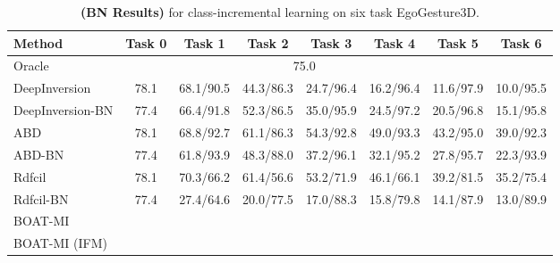 \documentclass[11pt]{article}
\begin{document}
\begin{table*}[h]
\centering
\caption{ \textbf{(BN Results)} for class-incremental learning on six task EgoGesture3D.}
\begin{tabular}{lccccccc}
\toprule
            Method &    Task 0 &    Task 1 &    Task 2 &    Task 3 &    Task 4 &    Task 5 &    Task 6 \\
\midrule
            Oracle &      \multicolumn{6}{c}{75.0} \\
\midrule 
        DeepInversion & 78.1 & 68.1/90.5 & 44.3/86.3 & 24.7/96.4 & 16.2/96.4 & 11.6/97.9 & 10.0/95.5 \\
     DeepInversion-BN & 77.4 & 66.4/91.8 & 52.3/86.5 & 35.0/95.9 & 24.5/97.2 & 20.5/96.8 & 15.1/95.8 \\
                  ABD & 78.1 & 68.8/92.7 & 61.1/86.3 & 54.3/92.8 & 49.0/93.3 & 43.2/95.0 & 39.0/92.3 \\
               ABD-BN & 77.4 & 61.8/93.9 & 48.3/88.0 & 37.2/96.1 & 32.1/95.2 & 27.8/95.7 & 22.3/93.9 \\
               Rdfcil & 78.1 & 70.3/66.2 & 61.4/56.6 & 53.2/71.9 & 46.1/66.1 & 39.2/81.5 & 35.2/75.4 \\
            Rdfcil-BN & 77.4 & 27.4/64.6 & 20.0/77.5 & 17.0/88.3 & 15.8/79.8 & 14.1/87.9 & 13.0/89.9 \\
\midrule 
        BOAT-MI &    \\
        BOAT-MI (IFM) &   \\      
\bottomrule
\end{tabular}
\label{tab:ego_gesture_bn}
\end{table*}
\end{document}
